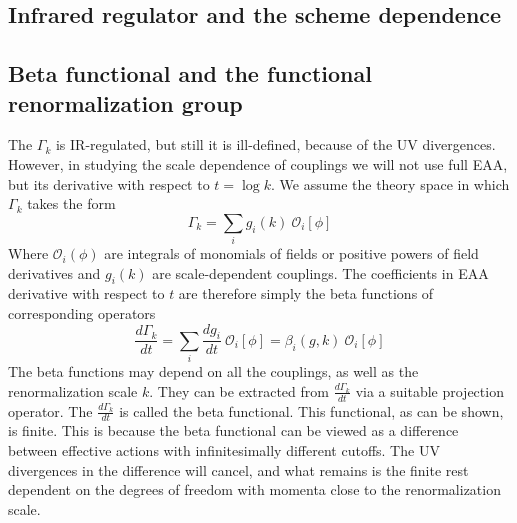 \documentclass[11pt, a4paper]{article}
\begin{document}
\subsection*{\centering Infrared regulator and the scheme dependence}

\subsection*{\centering Beta functional and the functional renormalization group}

The $\Gamma_k$ is IR-regulated, but still it is ill-defined, because of the UV divergences. 
However, in studying the scale dependence of couplings we will not use full EAA, 
but its derivative with respect to $t = \log{k}$.
We assume the theory space in which $\Gamma_k$ takes the form
\begin{equation}
    \Gamma_k = \sum_i g_i(k) \ \mathcal{O}_i [\phi]
\end{equation}
Where $\mathcal{O}_i (\phi)$ are integrals of monomials of fields or positive powers of field derivatives 
and $g_i(k)$ are scale-dependent couplings.
The coefficients in EAA derivative with respect to $t$ are therefore simply the beta functions of corresponding operators
\begin{equation}
    \frac{d \Gamma_k}{dt} = \sum_i \frac{d g_i}{dt} \ \mathcal{O}_i [\phi] = \beta_i(g,k) \ \mathcal{O}_i [\phi]
\end{equation}
The beta functions may depend on all the couplings, as well as the renormalization scale $k$.
They can be extracted from $\frac{d \Gamma_k}{dt}$ via a suitable projection operator. 
The $\frac{d \Gamma_k}{dt}$ is called the beta functional. This functional, as can be shown, is finite.
This is because the beta functional can be viewed as a difference between effective actions with infinitesimally
different cutoffs. The UV divergences in the difference will cancel, and what remains is the finite rest
dependent on the degrees of freedom with momenta close to the renormalization scale.
\end{document}
